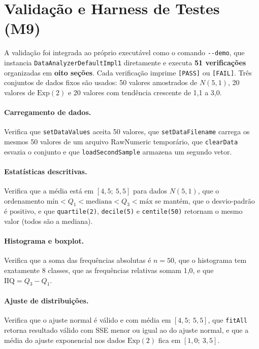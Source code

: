 \section{Validação e Harness de Testes (M9)}

A validação foi integrada ao próprio executável como o comando \texttt{-{}-demo}, que instancia \texttt{DataAnalyzerDefaultImpl1} diretamente e executa \textbf{51 verificações} organizadas em \textbf{oito seções}. Cada verificação imprime \texttt{[PASS]} ou \texttt{[FAIL]}. Três conjuntos de dados fixos são usados: 50 valores amostrados de $N(5, 1)$, 20 valores de $\text{Exp}(2)$ e 20 valores com tendência crescente de 1,1 a 3,0.

\paragraph{Carregamento de dados.} Verifica que \texttt{setDataValues} aceita 50 valores, que \texttt{setDataFilename} carrega os mesmos 50 valores de um arquivo RawNumeric temporário, que \texttt{clearData} esvazia o conjunto e que \texttt{loadSecondSample} armazena um segundo vetor.

\paragraph{Estatísticas descritivas.} Verifica que a média está em $[4{,}5;\ 5{,}5]$ para dados $N(5,1)$, que o ordenamento $\text{mín} < Q_1 < \text{mediana} < Q_3 < \text{máx}$ se mantém, que o desvio-padrão é positivo, e que \texttt{quartile(2)}, \texttt{decile(5)} e \texttt{centile(50)} retornam o mesmo valor (todos são a mediana).

\paragraph{Histograma e boxplot.} Verifica que a soma das frequências absolutas é $n = 50$, que o histograma tem exatamente 8 classes, que as frequências relativas somam 1,0, e que $\text{IIQ} = Q_3 - Q_1$.

\paragraph{Ajuste de distribuições.} Verifica que o ajuste normal é válido e com média em $[4{,}5;\ 5{,}5]$, que \texttt{fitAll} retorna resultado válido com SSE menor ou igual ao do ajuste normal, e que a média do ajuste exponencial nos dados $\text{Exp}(2)$ fica em $[1{,}0;\ 3{,}5]$.

